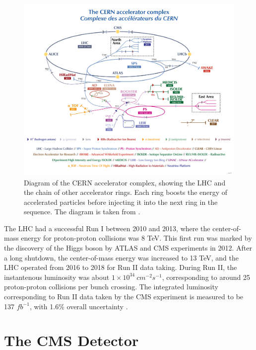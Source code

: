 \begin{figure}[htb]
    \begin{minipage}[t]{\linewidth}\centering
        \includegraphics[width=15cm]{lhc_complex.png}
    \end{minipage}
    \caption{Diagram of the CERN accelerator complex, showing the LHC and the chain of other accelerator rings. 
    Each ring boosts the energy of accelerated particles before injecting it into the next ring in the sequence.
    The diagram is taken from \cite{LHCAcceleratorComplex}.}
    \label{fig:lhc_diagram}
\end{figure}

The LHC had a successful Run I between 2010 and 2013, where the center-of-mass energy for proton-proton collisions was 8 TeV. This first run was marked 
by the discovery of the Higgs boson by ATLAS and CMS experiments in 2012. After a long shutdown, the center-of-mass energy was increased to 13 TeV, and the LHC
operated from 2016 to 2018 for Run II data taking. During Run II, the instantenous luminosity was about $1 \times 10^{34} \ cm^{-2} s^{-1}$, corresponding to around 
25 proton-proton collisions per bunch crossing. The integrated luminosity corresponding to Run II data taken by the CMS experiment is measured to be 137 $fb^{-1}$, 
with 1.6\% overall uncertainty \cite{lumi:2018,lumi:2017,lumi:2016}.

\section{The CMS Detector}


